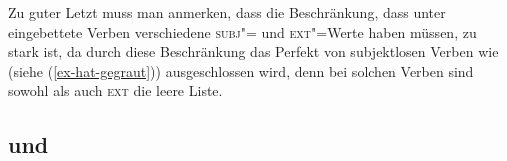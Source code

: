 {Zu guter Letzt muss man anmerken, dass die Beschränkung, dass unter \haben eingebettete
Verben verschiedene \textsc{subj}"= und \textsc{ext}"=Werte haben müssen, zu stark ist,
da durch diese Beschränkung das Perfekt von subjektlosen Verben
wie  (siehe (\ref{ex-hat-gegraut})) ausgeschlossen wird, denn bei solchen Verben sind
sowohl \subj als auch \textsc{ext} die leere Liste. 






\subsection{ und }
\label{kathol-pollard}\label{Abschnitt-Kathol-Pollard-ERG-Merkmal}




}
